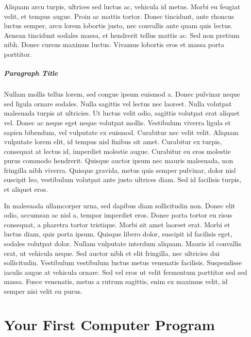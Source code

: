 Aliquam arcu turpis, ultrices sed luctus ac, vehicula id metus. Morbi eu
feugiat velit, et tempus augue. Proin ac mattis tortor. Donec tincidunt, ante
rhoncus luctus semper, arcu lorem lobortis justo, nec convallis ante quam quis
lectus. Aenean tincidunt sodales massa, et hendrerit tellus mattis ac. Sed non
pretium nibh. Donec cursus maximus luctus. Vivamus lobortis eros et massa porta
porttitor.

\paragraph{Paragraph Title} Nullam mollis tellus
lorem, sed congue ipsum euismod a. Donec pulvinar neque sed ligula ornare
sodales. Nulla sagittis vel lectus nec laoreet. Nulla volutpat malesuada turpis
at ultricies. Ut luctus velit odio, sagittis volutpat erat aliquet vel. Donec
ac neque eget neque volutpat mollis. Vestibulum viverra ligula et sapien
bibendum, vel vulputate ex euismod. Curabitur nec velit velit. Aliquam
vulputate lorem elit, id tempus nisl finibus sit amet. Curabitur ex turpis,
consequat at lectus id, imperdiet molestie augue. Curabitur eu eros molestie
purus commodo hendrerit. Quisque auctor ipsum nec mauris malesuada, non
fringilla nibh viverra. Quisque gravida, metus quis semper pulvinar, dolor nisl
suscipit leo, vestibulum volutpat ante justo ultrices diam. Sed id facilisis
turpis, et aliquet eros.

In malesuada ullamcorper urna, sed dapibus diam sollicitudin non. Donec elit
odio, accumsan ac nisl a, tempor imperdiet eros. Donec porta tortor eu risus
consequat, a pharetra tortor tristique. Morbi sit amet laoreet erat. Morbi et
luctus diam, quis porta ipsum. Quisque libero dolor, suscipit id facilisis
eget, sodales volutpat dolor. Nullam vulputate interdum aliquam. Mauris id
convallis erat, ut vehicula neque. Sed auctor nibh et elit fringilla, nec
ultricies dui sollicitudin. Vestibulum vestibulum luctus metus venenatis
facilisis. Suspendisse iaculis augue at vehicula ornare. Sed vel eros ut velit
fermentum porttitor sed sed massa. Fusce venenatis, metus a rutrum sagittis,
enim ex maximus velit, id semper nisi velit eu purus.


\chapter{Your First Computer Program}

